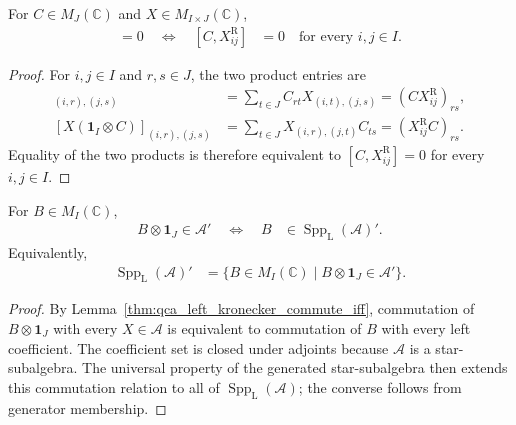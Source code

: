 \begin{lemma}
    \label{thm:qca_right_kronecker_commute_iff}
    \leanok
    For $C\in M_J(\mathbb C)$ and $X\in M_{I\times J}(\mathbb C)$,
    \begin{align}
        [\mathbf 1_I\otimes C,X]=0
        \quad\Longleftrightarrow\quad
        [C,X^{\mathrm R}_{ij}] & =0
        \quad\text{for every }i,j\in I.
    \end{align}
\end{lemma}

\begin{proof}\leanok
    For $i,j\in I$ and $r,s\in J$, the two product entries are
    \begin{align}
        [(\mathbf 1_I\otimes C)X]_{(i,r),(j,s)}
         & =\sum_{t\in J}C_{rt}X_{(i,t),(j,s)}
        =(CX^{\mathrm R}_{ij})_{rs},           \\
        [X(\mathbf 1_I\otimes C)]_{(i,r),(j,s)}
         & =\sum_{t\in J}X_{(i,r),(j,t)}C_{ts}
        =(X^{\mathrm R}_{ij}C)_{rs}.
    \end{align}
    Equality of the two products is therefore equivalent to
    $[C,X^{\mathrm R}_{ij}]=0$ for every $i,j\in I$.
\end{proof}

\begin{lemma}
    \label{thm:qca_left_support_centralizer}
    \leanok
    For $B\in M_I(\mathbb C)$,
    \begin{align}
        B\otimes\mathbf 1_J\in\mathcal A'
        \quad\Longleftrightarrow\quad
        B & \in\operatorname{Spp}_{\mathrm L}(\mathcal A)'.
    \end{align}
    Equivalently,
    \begin{align}
        \operatorname{Spp}_{\mathrm L}(\mathcal A)'
         & =\{B\in M_I(\mathbb C)\mid B\otimes\mathbf 1_J\in\mathcal A'\}.
    \end{align}
\end{lemma}

\begin{proof}\leanok
    By Lemma~\ref{thm:qca_left_kronecker_commute_iff}, commutation of
    $B\otimes\mathbf 1_J$ with every $X\in\mathcal A$ is equivalent to
    commutation of $B$ with every left coefficient.  The coefficient set is
    closed under adjoints because $\mathcal A$ is a star-subalgebra.  The
    universal property of the generated star-subalgebra then extends this
    commutation relation to all of
    $\operatorname{Spp}_{\mathrm L}(\mathcal A)$; the converse follows from
    generator membership.
\end{proof}

